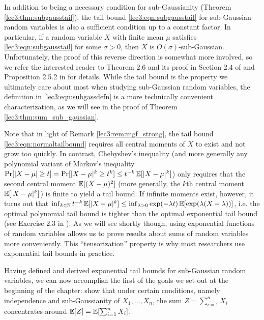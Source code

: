 \begin{remark}\label{lec3:rem:tail_bound_remark}
    In addition to being a necessary condition for sub-Gaussianity (Theorem \ref{lec3:thm:subgausstail}), the tail bound \eqref{lec3:eqn:subgausstail} for sub-Gaussian random variables is also a sufficient condition up to a constant factor. In particular, if a random variable $X$ with finite mean $\mu$ satisfies \eqref{lec3:eqn:subgausstail} for some $\sigma > 0$, then $X$ is $O(\sigma)$-sub-Gaussian. Unfortunately, the proof of this reverse direction is somewhat more involved, so we refer the interested reader to Theorem 2.6 and its proof in Section 2.4 of \cite{wainwright2019high} and Proposition 2.5.2 in \cite{vershynin2018high} for details. While the tail bound is the property we ultimately care about most when studying sub-Gaussian random variables, the definition in \eqref{lec3:eqn:subgassdefn} is a more technically convenient characterization, as we will see in the proof of Theorem \ref{lec3:thm:sum_sub_gaussian}.
\end{remark}

\begin{remark}
    Note that in light of Remark \ref{lec3:rem:mgf_strong}, the tail bound \eqref{lec3:eqn:normaltailbound} requires all central moments of $X$ to exist and not grow too quickly. In contrast, Chebyshev's inequality (and more generally any polynomial variant of Markov's inequality $\Pr[|X-\mu| \geq t] = \Pr[|X-\mu|^k \geq t^k] \leq t^{-k}\operatorname*{\mathbb{E}}[|X-\mu|^k]$) only requires that the second central moment $\operatorname*{\mathbb{E}}[(X-\mu)^2]$ (more generally, the $k$th central moment $\operatorname*{\mathbb{E}}[|X - \mu|^k]$) is finite to yield a tail bound. If infinite moments exist, however, it turns out that $\inf_{k \in \mathbb{N}} t^{-k}\operatorname*{\mathbb{E}}[|X-\mu|^k] \leq \inf_{\lambda > 0} \exp(-\lambda t) \operatorname*{\mathbb{E}}[\exp(\lambda (X-\lambda))]$, i.e. the optimal polynomial tail bound is tighter than the optimal exponential tail bound (see Exercise 2.3 in \cite{wainwright2019high}). As we will see shortly though, using exponential functions of random variables allows us to prove results about sums of random variables more conveniently. This ``tensorization'' property is why most researchers use exponential tail bounds in practice.
\end{remark}

Having defined and derived exponential tail bounds for sub-Gaussian random variables, we can now accomplish the first of the goals we set out at the beginning of the chapter: show that under certain conditions, namely independence and sub-Gaussianity of $X_1, \dotsc, X_n$, the sum $Z = \sum_{i = 1}^n X_i$ concentrates around $\operatorname*{\mathbb{E}}[Z] = \operatorname*{\mathbb{E}}[\sum_{i = 1}^n X_i]$.

